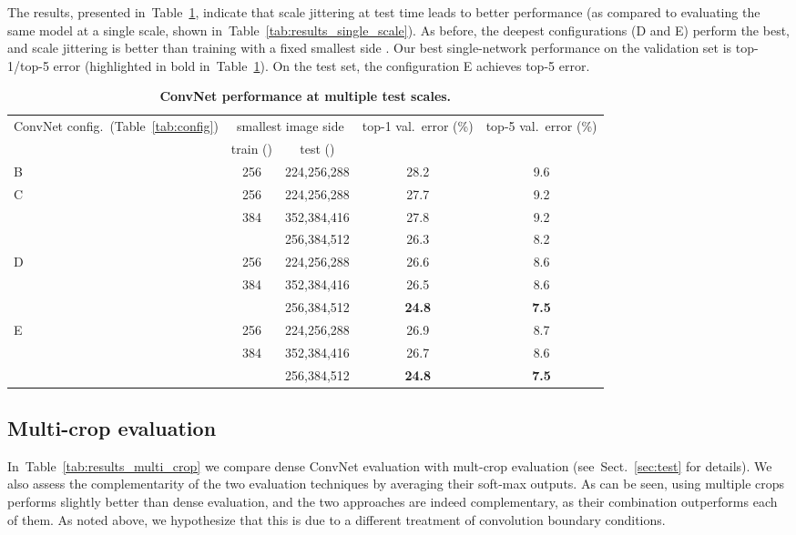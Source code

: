 \documentclass{article} \usepackage{iclr2015,times}
\newcommand{\tblref}[1]{Table~\ref{#1}}
\newcommand{\sref}[1]{Sect.~\ref{#1}}
\begin{document}
The results, presented in~\tblref{tab:results_multi_scale}, indicate that scale jittering at test time leads to better performance (as compared to evaluating 
the same model at a single scale, shown in~\tblref{tab:results_single_scale}). 
As before, the deepest configurations (D and E) perform the best, and scale jittering is better than training with a fixed smallest side .
Our best single-network performance on the validation set is  top-1/top-5 error (highlighted in bold in~\tblref{tab:results_multi_scale}).
On the test set, the configuration E achieves  top-5 error.

\vspace{-1em}

\begin{table}[htb]
\small
\centering
\caption{\textbf{ConvNet performance at multiple test scales.}
}
\begin{tabular}{|l|c|c|c|c|} \hline
ConvNet config.\ (\tblref{tab:config}) & \multicolumn{2}{c|}{smallest image side} & top-1 val.\ error (\%) & top-5 val.\ error (\%) \\ \cline{2-3}
& train () & test () & & \\ \hline
B & 256 & 224,256,288 & 28.2 & 9.6  \\ \hline
\multirow{3}{*}{C} & 256 & 224,256,288 & 27.7 & 9.2  \\ \cline{2-5}
 & 384 & 352,384,416 & 27.8 & 9.2  \\ \cline{2-5}
 &  & 256,384,512 & 26.3 & 8.2  \\ \hline 
\multirow{3}{*}{D} & 256 & 224,256,288 & 26.6  & 8.6  \\ \cline{2-5}
 & 384 & 352,384,416 & 26.5  & 8.6  \\ \cline{2-5}
 &  & 256,384,512 & \textbf{24.8}  & \textbf{7.5}  \\ \hline 
\multirow{3}{*}{E} & 256 & 224,256,288 & 26.9  & 8.7  \\ \cline{2-5}
 & 384 & 352,384,416 & 26.7  & 8.6  \\ \cline{2-5}
 &  & 256,384,512 & \textbf{24.8}  & \textbf{7.5}  \\ \hline 
\end{tabular}
\label{tab:results_multi_scale}
\end{table}


\subsection{Multi-crop evaluation}
\label{sec:multi-crop}
In~\tblref{tab:results_multi_crop} we compare dense ConvNet evaluation with mult-crop evaluation (see~\sref{sec:test} for details). We also assess the complementarity of the two evaluation techniques by averaging their soft-max outputs. As can be seen, using multiple crops performs slightly better than dense evaluation, and the two approaches are indeed complementary, as their combination outperforms each of them. As noted above, we hypothesize that this is due to a different treatment of convolution boundary conditions.
\end{document}
